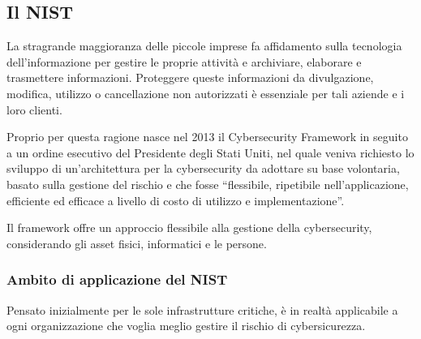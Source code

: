 \subsection{Il NIST}
\cite{NIST}
La stragrande maggioranza delle piccole imprese fa affidamento sulla tecnologia dell'informazione per gestire le proprie attività e archiviare, elaborare e trasmettere informazioni. Proteggere queste informazioni da divulgazione, modifica, utilizzo o cancellazione non autorizzati è essenziale per tali aziende e i loro clienti.

Proprio per questa ragione nasce nel 2013 il Cybersecurity Framework in seguito a un ordine esecutivo del Presidente degli Stati Uniti, nel quale veniva richiesto lo sviluppo di un’architettura per la cybersecurity da adottare su base volontaria, basato sulla gestione del rischio e che fosse “flessibile, ripetibile nell’applicazione, efficiente ed efficace a livello di costo di utilizzo e implementazione”.

Il framework offre un approccio flessibile alla gestione della cybersecurity, considerando gli asset fisici, informatici e le persone.
\subsubsection{Ambito di applicazione del NIST}
Pensato inizialmente per le sole infrastrutture critiche, è in realtà applicabile a ogni organizzazione che voglia meglio gestire il rischio di cybersicurezza.
